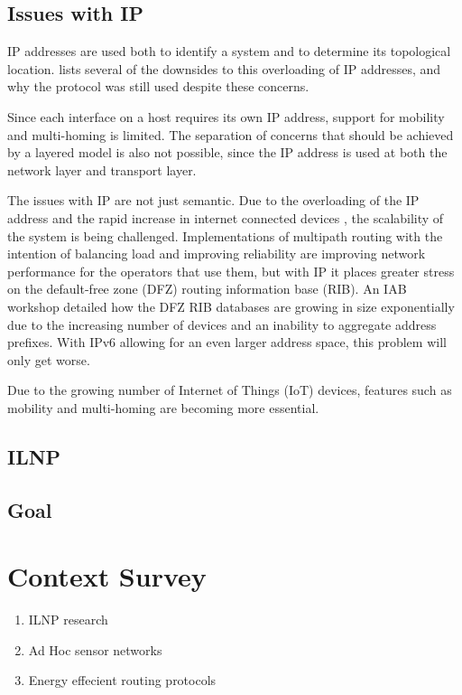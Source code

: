 \documentclass[12pt]{article}
\begin{document}
\subsection{Issues with IP}

IP addresses are used both to identify a system and to determine its topological location. \cite{briancarpenter2014} lists several of the downsides to this overloading of IP addresses, and why the protocol was still used despite these concerns. 

Since each interface on a host requires its own IP address, support for mobility and multi-homing is limited. The separation of concerns that should be achieved by a layered model is also not possible, since the IP address is used at both the network layer and transport layer. 

The issues with IP are not just semantic. Due to the overloading of the IP address and the rapid increase in internet connected devices \cite{iot_stat}, the scalability of the system is being challenged. Implementations of multipath routing with the intention of balancing load and improving reliability are improving network performance for the operators that use them, but with IP it places greater stress on the default-free zone (DFZ) routing information base (RIB). An IAB workshop \cite{rfc4984} detailed how the DFZ RIB databases are growing in size exponentially due to the increasing number of devices and an inability to aggregate address prefixes. With IPv6 allowing for an even larger address space, this problem will only get worse. 

Due to the growing number of Internet of Things (IoT) devices, features such as mobility and multi-homing are becoming more essential. 

\subsection{ILNP}

\subsection{Goal}


\section{Context Survey}

\begin{enumerate}
\item ILNP research 
\item Ad Hoc sensor networks
\item Energy effecient routing protocols
\end{enumerate}
\end{document}
